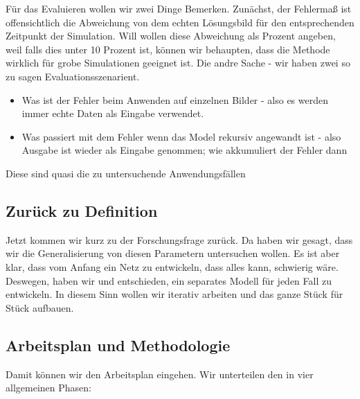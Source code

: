 \documentclass[margin=0.05in, tmargin=0.01in]{article}
\begin{document}
Für das Evaluieren wollen wir zwei Dinge Bemerken. Zunächst, der Fehlermaß ist offensichtlich die Abweichung von dem echten Lösungsbild für den entsprechenden Zeitpunkt der Simulation. Will wollen diese Abweichung als Prozent angeben, weil falls dies unter 10 Prozent ist, können wir behaupten, dass die Methode wirklich für grobe Simulationen geeignet ist. Die andre Sache - wir haben zwei so zu sagen Evaluationsszenarient. 
\begin{itemize}
\item Was ist der Fehler beim Anwenden auf einzelnen Bilder - also es werden immer echte Daten als Eingabe verwendet.
\item Was passiert mit dem Fehler wenn das Model rekursiv angewandt ist - also Ausgabe ist wieder als Eingabe genommen; wie akkumuliert der Fehler dann
\end{itemize}
Diese sind quasi die zu untersuchende Anwendungsfällen

\subsection{Zurück zu Definition}
\label{sec:orgaee98a2}
Jetzt kommen wir kurz zu der Forschungsfrage zurück. Da haben wir gesagt, dass wir die Generalisierung von diesen Parametern untersuchen wollen. Es ist aber klar, dass vom Anfang ein Netz zu entwickeln, dass alles kann, schwierig wäre. Deswegen, haben wir und entschieden, ein separates Modell für jeden Fall zu entwickeln. In diesem Sinn wollen wir iterativ arbeiten und das ganze Stück für Stück aufbauen.


\subsection{Arbeitsplan und Methodologie}
\label{sec:org0517a2d}
Damit können wir den Arbeitsplan eingehen. Wir unterteilen den in vier allgemeinen Phasen:
\end{document}
